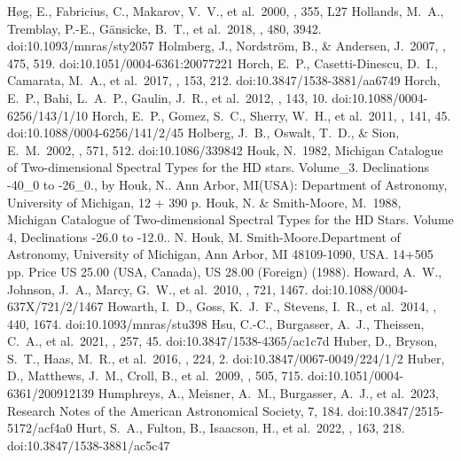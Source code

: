 \documentclass[twocolumn,tighten,twocolappendix]{aastex631}
\begin{document}
\begin{thebibliography}{}
 H{\o}g, E., Fabricius, C., Makarov, V.~V., et al.\ 2000, \aap, 355, L27
 Hollands, M.~A., Tremblay, P.-E., G{\"a}nsicke, B.~T., et al.\ 2018, \mnras, 480, 3942. doi:10.1093/mnras/sty2057
 Holmberg, J., Nordstr{\"o}m, B., \& Andersen, J.\ 2007, \aap, 475, 519. doi:10.1051/0004-6361:20077221
 Horch, E.~P., Casetti-Dinescu, D.~I., Camarata, M.~A., et al.\ 2017, \aj, 153, 212. doi:10.3847/1538-3881/aa6749
 Horch, E.~P., Bahi, L.~A.~P., Gaulin, J.~R., et al.\ 2012, \aj, 143, 10. doi:10.1088/0004-6256/143/1/10
 Horch, E.~P., Gomez, S.~C., Sherry, W.~H., et al.\ 2011, \aj, 141, 45. doi:10.1088/0004-6256/141/2/45
 Holberg, J.~B., Oswalt, T.~D., \& Sion, E.~M.\ 2002, \apj, 571, 512. doi:10.1086/339842
 Houk, N.\ 1982, Michigan Catalogue of Two-dimensional Spectral Types for the HD stars. Volume\_3. Declinations -40\_{\textflorin}0 to -26\_{\textflorin}0., by Houk, N..  Ann Arbor, MI(USA): Department of Astronomy, University of Michigan, 12 + 390 p.
 Houk, N. \& Smith-Moore, M.\ 1988, Michigan Catalogue of Two-dimensional Spectral Types for the HD Stars. Volume 4, Declinations -26{\textdegree}.0 to -12{\textdegree}.0.. N. Houk, M. Smith-Moore.Department of Astronomy, University of Michigan, Ann Arbor, MI 48109-1090, USA. 14+505 pp. Price US 25.00 (USA, Canada), US 28.00 (Foreign) (1988).
 Howard, A.~W., Johnson, J.~A., Marcy, G.~W., et al.\ 2010, \apj, 721, 1467. doi:10.1088/0004-637X/721/2/1467
 Howarth, I.~D., Goss, K.~J.~F., Stevens, I.~R., et al.\ 2014, \mnras, 440, 1674. doi:10.1093/mnras/stu398
 Hsu, C.-C., Burgasser, A.~J., Theissen, C.~A., et al.\ 2021, \apjs, 257, 45. doi:10.3847/1538-4365/ac1c7d
 Huber, D., Bryson, S.~T., Haas, M.~R., et al.\ 2016, \apjs, 224, 2. doi:10.3847/0067-0049/224/1/2
 Huber, D., Matthews, J.~M., Croll, B., et al.\ 2009, \aap, 505, 715. doi:10.1051/0004-6361/200912139
 Humphreys, A., Meisner, A.~M., Burgasser, A.~J., et al.\ 2023, Research Notes of the American Astronomical Society, 7, 184. doi:10.3847/2515-5172/acf4a0
 Hurt, S.~A., Fulton, B., Isaacson, H., et al.\ 2022, \aj, 163, 218. doi:10.3847/1538-3881/ac5c47

\end{thebibliography}
\end{document}
